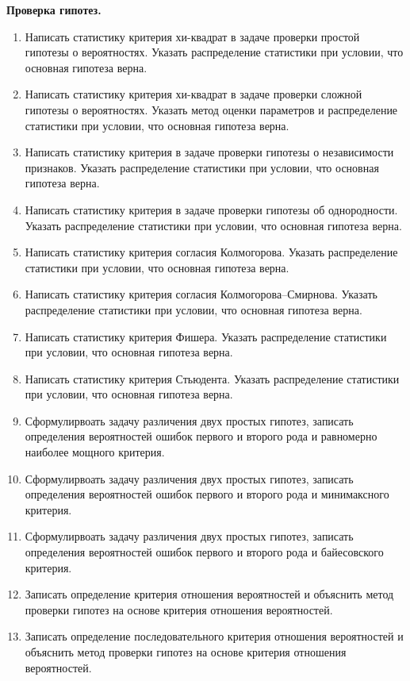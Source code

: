 \documentclass[a4paper,12pt]{article}
\newcommand{\theme}[1]{\hfil \textbf{#1} \hfil}
\begin{document}
\theme{Проверка гипотез.}
\begin{enumerate}[resume]
    \item Написать статистику критерия хи-квадрат в задаче проверки простой гипотезы о вероятностях. Указать распределение статистики при условии, что основная гипотеза верна.
    \item Написать статистику критерия хи-квадрат в задаче проверки сложной гипотезы о вероятностях. Указать метод оценки параметров и распределение статистики при условии, что основная гипотеза верна.
    \item Написать статистику критерия в задаче проверки гипотезы о независимости признаков. Указать распределение статистики при условии, что основная гипотеза верна.
    \item Написать статистику критерия в задаче проверки гипотезы об однородности. Указать распределение статистики при условии, что основная гипотеза верна.
    \item Написать статистику критерия согласия Колмогорова. Указать распределение статистики при условии, что основная гипотеза верна.
    \item Написать статистику критерия согласия Колмогорова--Смирнова. Указать распределение статистики при условии, что основная гипотеза верна.
    \item Написать статистику критерия Фишера. Указать распределение статистики при условии, что основная гипотеза верна.
    \item Написать статистику критерия Стьюдента. Указать распределение статистики при условии, что основная гипотеза верна.
    \item Сформулирвоать задачу различения двух простых гипотез, записать определения вероятностей ошибок первого и второго рода и равномерно наиболее мощного критерия.
    \item Сформулирвоать задачу различения двух простых гипотез, записать определения вероятностей ошибок первого и второго рода и минимаксного критерия.
    \item Сформулирвоать задачу различения двух простых гипотез, записать определения вероятностей ошибок первого и второго рода и байесовского критерия.
    \item Записать определение критерия отношения вероятностей и объяснить метод проверки гипотез на основе критерия отношения вероятностей.
    \item Записать определение последовательного критерия отношения вероятностей и объяснить метод проверки гипотез на основе критерия отношения вероятностей.
\end{enumerate}
\end{document}
